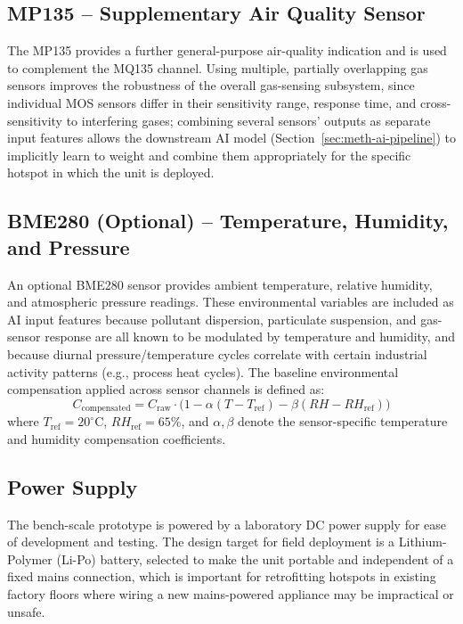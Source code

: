 \subsection{MP135 -- Supplementary Air Quality Sensor}
The MP135 provides a further general-purpose air-quality indication and is used to complement the MQ135 channel. Using multiple, partially overlapping gas sensors improves the robustness of the overall gas-sensing subsystem, since individual MOS sensors differ in their sensitivity range, response time, and cross-sensitivity to interfering gases; combining several sensors' outputs as separate input features allows the downstream AI model (Section~\ref{sec:meth-ai-pipeline}) to implicitly learn to weight and combine them appropriately for the specific hotspot in which the unit is deployed.

\subsection{BME280 (Optional) -- Temperature, Humidity, and Pressure}
An optional BME280 sensor provides ambient temperature, relative humidity, and atmospheric pressure readings. These environmental variables are included as AI input features because pollutant dispersion, particulate suspension, and gas-sensor response are all known to be modulated by temperature and humidity, and because diurnal pressure/temperature cycles correlate with certain industrial activity patterns (e.g., process heat cycles). The baseline environmental compensation applied across sensor channels is defined as:
\begin{equation}
C_{\text{compensated}} = C_{\text{raw}} \cdot \Big(1 - \alpha (T - T_{\text{ref}}) - \beta (RH - RH_{\text{ref}})\Big)
\label{eq:corr}
\end{equation}
where $T_{\text{ref}} = 20^\circ\text{C}$, $RH_{\text{ref}} = 65\%$, and $\alpha, \beta$ denote the sensor-specific temperature and humidity compensation coefficients.

\subsection{Power Supply}
The bench-scale prototype is powered by a laboratory DC power supply for ease of development and testing. The design target for field deployment is a Lithium-Polymer (Li-Po) battery, selected to make the unit portable and independent of a fixed mains connection, which is important for retrofitting hotspots in existing factory floors where wiring a new mains-powered appliance may be impractical or unsafe.

